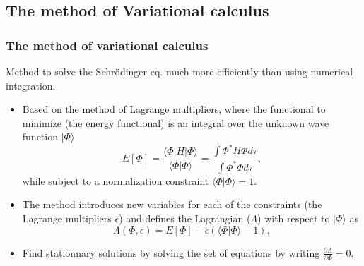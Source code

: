 \documentclass[xcolor=pdftex,hyperref={pdfpagelabels=false},table]{beamer}
\begin{document}
\subsection{The method of Variational calculus}
\begin{frame}
\frametitle{The method of variational calculus}
\begin{scriptsize}
\begin{definition}
  Method to solve the Schr\"odinger eq. much more efficiently than using numerical integration.
\end{definition}
\begin{itemize}
\item Based on the method of Lagrange multipliers, where the functional to minimize (the energy functional) is an integral over the unknown wave function $| \Phi \rangle$
\begin{equation} 
  E[\Phi]= \frac{\langle \Phi |H | \Phi \rangle}{\langle \Phi | \Phi \rangle}= \frac{ \int \Phi^* H  \Phi d \tau}{\int  \Phi^*  \Phi d \tau},
\end{equation}
while subject to a normalization constraint $\langle \Phi | \Phi \rangle=1$.
\item The method introduces new variables for each of the constraints (the Lagrange multipliers $\epsilon$) and defines  the Lagrangian ($\Lambda$) with respect to $| \Phi \rangle$ as
\begin{equation} 
  \Lambda(\Phi,\epsilon)= E[\Phi] - \epsilon \left( \langle \Phi | \Phi \rangle -1 \right),
\end{equation}
\item Find stationnary solutions by solving the set of equations by writing $\frac{\partial \Lambda}{\partial\Phi}=0$.
\end{itemize}

\end{scriptsize}
\end{frame}
\end{document}
